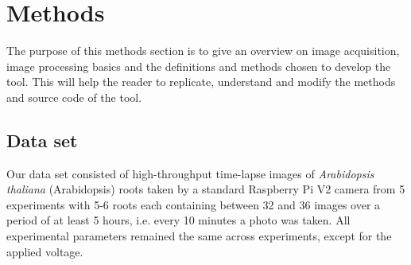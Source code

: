 
\chapter{Methods} %

\label{methods} %

%

The purpose of this methods section is to give an overview on
image acquisition, image processing basics and the definitions and methods chosen to develop the tool. 
This will help the reader to replicate, understand and modify the methods and source code of the tool. 

\section{Data set}\label{sec:data}

Our data set consisted of high-throughput time-lapse images of \textit{Arabidopsis thaliana} (Arabidopsis) roots taken by a standard Raspberry Pi V2 camera from 5 experiments with 5-6 roots each containing between 32 and 36 images over a period of at least 5 hours, i.e. every 10 minutes a photo was taken. 
All experimental parameters remained the same across experiments, except for the applied voltage.

